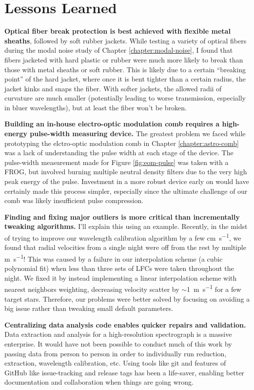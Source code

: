 \section{Lessons Learned} \label{conclusion:lessons}

\textbf{Optical fiber break protection is best achieved with flexible metal sheaths}, followed by soft rubber jackets. While testing a variety of optical fibers during the modal noise study of Chapter \ref{chapter:modal-noise}, I found that fibers jacketed with hard plastic or rubber were much more likely to break than those with metal sheaths or soft rubber. This is likely due to a certain ``breaking point'' of the hard jacket, where once it is bent tighter than a certain radius, the jacket kinks and snaps the fiber. With softer jackets, the allowed radii of curvature are much smaller (potentially leading to worse transmission, especially in bluer wavelengths), but at least the fiber won't be broken.

\textbf{Building an in-house electro-optic modulation comb requires a high-energy pulse-width measuring device.} The greatest problem we faced while prototyping the elctro-optic modulation comb in Chapter \ref{chapter:astro-comb} was a lack of understanding the pulse width at each stage of the device. The pulse-width measurement made for Figure \ref{fig:eom-pulse} was taken with a FROG, but involved burning multiple neutral density filters due to the very high peak energy of the pulse. Investment in a more robust device early on would have certainly made this process simpler, especially since the ultimate challenge of our comb was likely insufficient pulse compression.

\textbf{Finding and fixing major outliers is more critical than incrementally tweaking algorithms.} I'll explain this using an example. Recently, in the midst of trying to improve our wavelength calibration algorithm by a few \si{\centi\meter\per\second}, we found that radial velocities from a single night were off from the rest by multiple \si{\meter\per\second}! This was caused by a failure in our interpolation scheme (a cubic polynomial fit) when less than three sets of LFCs were taken throughout the night. We fixed it by instead implementing a linear interpolation scheme with nearest neighbors weighting, decreasing velocity scatter by $\sim$1~\si{\meter\per\second} for a few target stars. Therefore, our problems were better solved by focusing on avoiding a big issue rather than tweaking small default parameters.

\textbf{Centralizing data analysis code enables quicker repairs and validation.} Data extraction and analysis for a high-resolution spectrograph is a massive enterprise. It would have not been possible to conduct much of this work by passing data from person to person in order to individually run reduction, extraction, wavelength calibration, etc. Using tools like git and features of GitHub like issue-tracking and release tags has been a life-saver, enabling better documentation and collaboration when things are going wrong.

